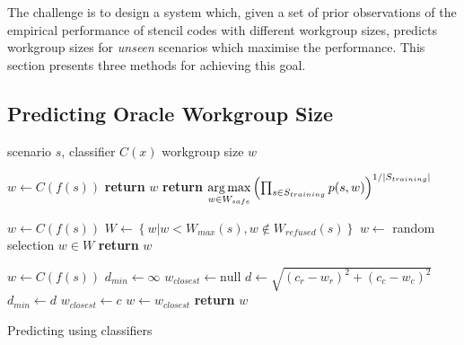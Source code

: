 \documentclass[nonatbib,preprint,10pt]{sigplanconf}
\begin{document}
The challenge is to design a system which, given a set of prior
observations of the empirical performance of stencil codes with
different workgroup sizes, predicts workgroup sizes for \emph{unseen}
scenarios which maximise the performance. This section presents three
methods for achieving this goal.


\subsection{Predicting Oracle Workgroup Size}

\begin{algorithm}[t]
\begin{algorithmic}[1]
\Require scenario $s$, classifier $C(x)$
\Ensure workgroup size $w$

\State $w \leftarrow C(f(s))$
    \State \textbf{return} $w$
\Else
  \State \textbf{return} $\underset{w \in W_{safe}}{\operatorname*{arg\,max}}
\left(
  \prod_{s \in S_{training}} p(s, w)
\right)^{1/|S_{training}|}$
\EndIf
\EndProcedure
\item[] %

\State $w \leftarrow C(f(s))$
  \State $W \leftarrow \left\{ w | w < W_{max}(s), w \not\in W_{refused}(s) \right\}$
  \State $w \leftarrow $ random selection $w \in W$
\EndWhile
\State \textbf{return} $w$
\EndProcedure
\item[] %

\State $w \leftarrow C(f(s))$
  \State $d_{min} \leftarrow \infty$
  \State $w_{closest} \leftarrow \text{null}$
    \State $d \leftarrow \sqrt{\left(c_r - w_r\right)^2 + \left(c_c - w_c\right)^2}$
      \State $d_{min} \leftarrow d$
      \State $w_{closest} \leftarrow c$
    \EndIf
  \EndFor
  \State $w \leftarrow w_{closest}$
\EndWhile
\State \textbf{return} $w$
\EndProcedure
\end{algorithmic}
\caption{Predicting using classifiers}
\label{alg:autotune-classification}
\end{algorithm}
\end{document}
